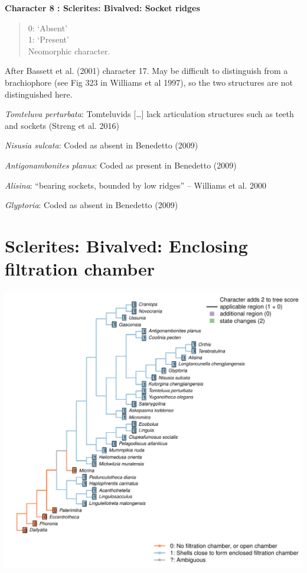 \documentclass[]{book}
\theoremstyle{definition}
\theoremstyle{definition}
\theoremstyle{definition}
\theoremstyle{remark}
\begin{document}
\textbf{Character 8 : Sclerites: Bivalved: Socket ridges }

\begin{quote}
0: `Absent'\\
1: `Present'\\
Neomorphic character.
\end{quote}

After Bassett et al. (2001) character 17. May be difficult to
distinguish from a brachiophore (see Fig 323 in Williams et al 1997), so
the two structures are not distinguished here.

\emph{Tomteluva perturbata}: Tomteluvids {[}\ldots{}{]} lack
articulation structures such as teeth and sockets (Streng et al. 2016)

\emph{Nisusia sulcata}: Coded as absent in Benedetto (2009)

\emph{Antigonambonites planus}: Coded as present in Benedetto (2009)

\emph{Alisina}: ``bearing sockets, bounded by low ridges'' -- Williams
et al. 2000

\emph{Glyptoria}: Coded as absent in Benedetto (2009)

\hypertarget{sclerites-bivalved-enclosing-filtration-chamber}{%
\section*{Sclerites: Bivalved: Enclosing filtration
chamber}\label{sclerites-bivalved-enclosing-filtration-chamber}}

\includegraphics{Brachiopod_phylogeny_files/figure-latex/unnamed-chunk-5-9.pdf}
\end{document}
